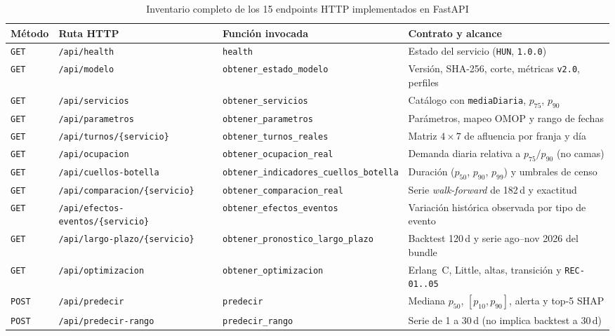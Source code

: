 \begin{table}[htbp]
\caption{Inventario completo de los 15 endpoints HTTP implementados en FastAPI}
\label{tab:anexo_endpoints}
{\singlespacing\footnotesize
\begin{tabularx}{\textwidth}{@{}l L{0.29\textwidth} L{0.28\textwidth} Y@{}}
\toprule
Método & Ruta HTTP & Función invocada & Contrato y alcance \\
\midrule
\texttt{GET} & \texttt{/api/health} & \texttt{health} & Estado del servicio (\texttt{HUN}, \texttt{1.0.0}) \\
\texttt{GET} & \texttt{/api/modelo} & \texttt{obtener\_estado\_modelo} & Versión, SHA-256, corte, métricas \texttt{v2.0}, perfiles \\
\texttt{GET} & \texttt{/api/servicios} & \texttt{obtener\_servicios} & Catálogo con \texttt{mediaDiaria}, $p_{75}$, $p_{90}$ \\
\texttt{GET} & \texttt{/api/parametros} & \texttt{obtener\_parametros} & Parámetros, mapeo OMOP y rango de fechas \\
\texttt{GET} & \texttt{/api/turnos/\{servicio\}} & \texttt{obtener\_turnos\_reales} & Matriz $4\times 7$ de afluencia por franja y día \\
\texttt{GET} & \texttt{/api/ocupacion} & \texttt{obtener\_ocupacion\_real} & Demanda diaria relativa a $p_{75}/p_{90}$ (no camas) \\
\texttt{GET} & \texttt{/api/cuellos-botella} & \nolinkurl{obtener_indicadores_cuellos_botella} & Duración ($p_{50}$, $p_{90}$, $p_{99}$) y umbrales de censo \\
\texttt{GET} & \texttt{/api/comparacion/\{servicio\}} & \nolinkurl{obtener_comparacion_real} & Serie \textit{walk-forward} de 182\,d y exactitud \\
\texttt{GET} & \texttt{/api/efectos-eventos/\{servicio\}} & \nolinkurl{obtener_efectos_eventos} & Variación histórica observada por tipo de evento \\
\texttt{GET} & \texttt{/api/largo-plazo/\{servicio\}} & \nolinkurl{obtener_pronostico_largo_plazo} & Backtest 120\,d y serie ago--nov 2026 del bundle \\
\texttt{GET} & \texttt{/api/optimizacion} & \texttt{obtener\_optimizacion} & Erlang~C, Little, altas, transición y \texttt{REC-01..05} \\
\texttt{POST} & \texttt{/api/predecir} & \texttt{predecir} & Mediana $p_{50}$, $[p_{10}, p_{90}]$, alerta y top-5 SHAP \\
\texttt{POST} & \texttt{/api/predecir-rango} & \texttt{predecir\_rango} & Serie de 1 a 30\,d (no implica backtest a 30\,d) \\

\end{tabularx}}
\end{table}
